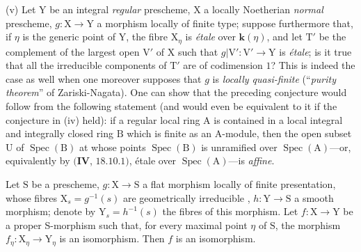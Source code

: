 \begin{remarks}[21.12.14]
(v) Let $\mathrm{Y}$ be an integral \emph{regular} prescheme, $\mathrm{X}$ a locally Noetherian \emph{normal} prescheme, $g:\mathrm{X}\to\mathrm{Y}$ a morphism locally of finite type; suppose furthermore that, if $\eta$ is the generic point of $\mathrm{Y}$, the fibre $\mathrm{X}_\eta$ is \emph{\'etale} over $\boldsymbol{k}(\eta)$, and let $\mathrm{T}'$ be the complement of the largest open $\mathrm{V}'$ of $\mathrm{X}$ such that $g|\mathrm{V}':\mathrm{V}'\to\mathrm{Y}$ is \emph{\'etale}; is it true that all the irreducible components of $\mathrm{T}'$ are of codimension $1$?
This is indeed the case as well when one moreover supposes that $g$ is \emph{locally quasi-finite} (``\emph{purity theorem}'' of Zariski-Nagata).
One can show that the preceding conjecture would follow from the following statement (and would even be equivalent to it if the conjecture in (iv) held): if a regular local ring $\mathrm{A}$ is contained in a local integral and integrally closed ring $\mathrm{B}$ which is finite as an A-module, then the open subset $\mathrm{U}$ of $\operatorname{Spec}(\mathrm{B})$ at whose points $\operatorname{Spec}(\mathrm{B})$ is unramified over $\operatorname{Spec}(\mathrm{A})$---or, equivalently by $(\mathbf{IV}$, $18.10.1)$, \'etale over $\operatorname{Spec}(\mathrm{A})$---is \emph{affine}.
\end{remarks}

\begin{proposition}[21.12.15]
\label{IV.21.12.15}
Let $\mathrm{S}$ be a prescheme, $g:\mathrm{X}\to\mathrm{S}$ a flat morphism locally of finite presentation, whose fibres $\mathrm{X}_s=g^{-1}(s)$ are geometrically irreducible , $h:\mathrm{Y}\to\mathrm{S}$ a smooth morphism; denote by $\mathrm{Y}_s=h^{-1}(s)$ the fibres of this morphism.
Let $f:\mathrm{X}\to\mathrm{Y}$ be a proper S-morphism such that, for every maximal point $\eta$ of $\mathrm{S}$, the morphism $f_\eta:\mathrm{X}_\eta\to\mathrm{Y}_\eta$ is an isomorphism.
Then $f$ is an isomorphism.
\end{proposition}

